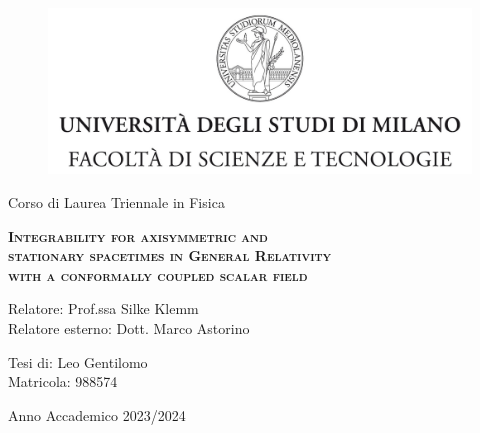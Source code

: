 \begin{titlepage}
	
	\begin{figure}
		\centering
		\includegraphics[width=424pt]{Figures/Frontespizio/tesiSCIENZE_TECNOLOGIE.jpg }
		\vspace{0.5 cm}
	\end{figure}


\begin{center}
{\LARGE Corso di Laurea Triennale in Fisica}
\end{center}

\begin{center}
\vspace{3 cm}
{\Large \textsc{\textbf{Integrability for axisymmetric and \\ stationary spacetimes in General Relativity \\ \vskip 4mm with a conformally coupled scalar field}} }
\end{center}
\par
  \vspace{3 cm}
  
  \begin{flushleft}{\large
  		 Relatore: Prof.ssa Silke Klemm\\
		 
  		 \noindent Relatore esterno: Dott. Marco Astorino \\
     }
  \end{flushleft}
  \vspace{1 cm}
  \begin{flushright}{\large
  	Tesi di: Leo Gentilomo\\ Matricola: 988574
   }
  \end{flushright}
    	  
\vfill
\begin{center}
	{\Large Anno Accademico 2023/2024}
\end{center}
\end{titlepage}